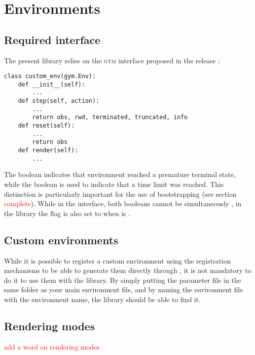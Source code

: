 \chapter{Environments}

\section{Required interface}

The present library relies on the \textsc{gym} interface proposed in the release :

\begin{verbatim}
class custom_env(gym.Env):
	def __init__(self):
		...
	def step(self, action):
		...
		return obs, rwd, terminated, truncated, info
	def reset(self):
		...
		return obs
	def render(self):
		...
\end{verbatim}

 The  boolean indicates that environment reached a premature terminal state, while the  boolean is used to indicate that a time limit was reached. This distinction is particularly important for the use of bootstrapping (see section \textcolor{red}{complete}). While in the \gym interface, both booleans cannot be simultaneously , in the library the  flag is also set to  when  is .

\section{Custom environments}

While it is possible to register a custom environment using the \gym registration mechanisms to be able to generate them directly through , it is not mandatory to do it to use them with the library. By simply putting the  parameter file in the same folder as your main environment file, and by naming the environment file with the environment name, the library should be able to find it.

\section{Rendering modes}

\textcolor{red}{add a word on rendering modes}